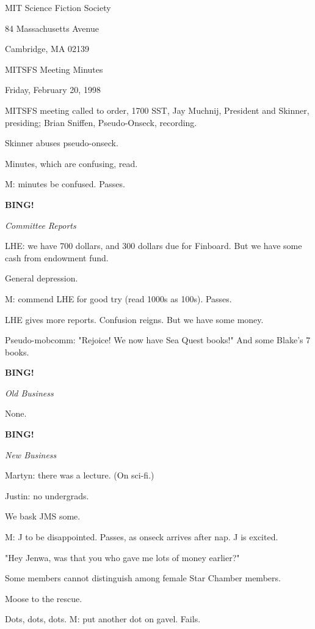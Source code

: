 \documentclass[12pt]{article}
\newcommand{\bing}{{\bf BING!} }
\newcommand{\goto}[1]{\bing \vskip 12pt \centerline{{\em{#1}}}}
\begin{document}
\begin{center}

MIT Science Fiction Society 

84 Massachusetts Avenue

Cambridge, MA 02139

\vspace{12pt}

MITSFS Meeting Minutes 

Friday, February 20, 1998

\end{center}
 
\vspace{18pt}

\setlength{\parskip}{6pt}

\noindent
MITSFS meeting called to order, 1700 SST,
Jay Muchnij, President and Skinner, presiding; Brian Sniffen, Pseudo-Onseck, recording.

Skinner abuses pseudo-onseck.

Minutes, which are confusing, read.

M: minutes be confused. Passes.

\goto{Committee Reports}

LHE: we have 700 dollars, and 300 dollars due for Finboard. But we have some cash from endowment fund.

General depression.

M: commend LHE for good try (read 1000s as 100s). Passes.

LHE gives more reports. Confusion reigns. But we have some money.

Pseudo-mobcomm: "Rejoice! We now have Sea Quest books!" And some Blake's 7 books.

\goto{Old Business}

None.

\goto{New Business}

Martyn: there was a lecture. (On sci-fi.)

Justin: no undergrads.

We bask JMS some.

M: J to be disappointed. Passes, as onseck arrives after nap. J is excited.

"Hey Jenwa, was that you who gave me lots of money earlier?"

Some members cannot distinguish among female Star Chamber members.

Moose to the rescue.

Dots, dots, dots. M: put another dot on gavel. Fails.
\end{document}
